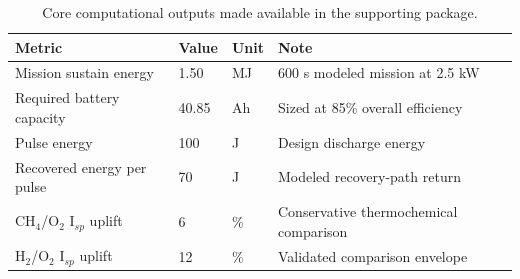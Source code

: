 \begin{table}[h]
\centering
\caption{Core computational outputs made available in the supporting package.}
\begin{tabular}{p{4.0cm}p{2.4cm}p{2.0cm}p{5.0cm}}
\toprule
Metric & Value & Unit & Note \\
\midrule
Mission sustain energy & 1.50 & MJ & 600 s modeled mission at 2.5 kW \\
Required battery capacity & 40.85 & Ah & Sized at 85\% overall efficiency \\
Pulse energy & 100 & J & Design discharge energy \\
Recovered energy per pulse & 70 & J & Modeled recovery-path return \\
CH$_4$/O$_2$ I$_{sp}$ uplift & 6 & \% & Conservative thermochemical comparison \\
H$_2$/O$_2$ I$_{sp}$ uplift & 12 & \% & Validated comparison envelope \\
\bottomrule
\end{tabular}
\end{table}
